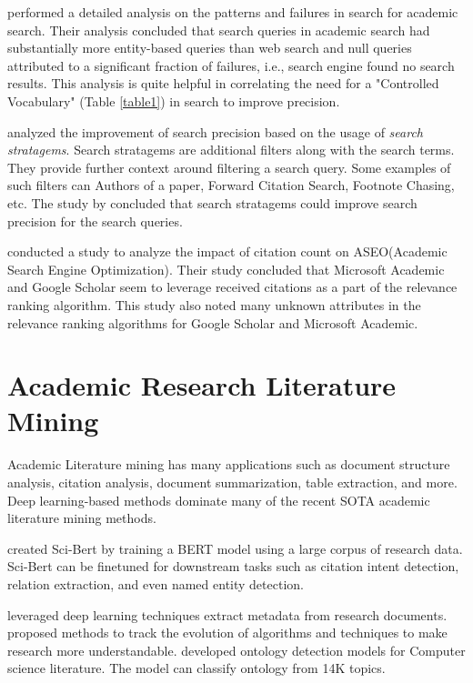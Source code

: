 \cite{li2017investigating} performed a detailed analysis on the patterns and failures in search for academic search. 
Their analysis concluded that search queries in academic search had substantially more entity-based queries than web search and 
null queries attributed to a significant fraction of failures, i.e., search engine found no search results. 
This analysis is quite helpful in correlating the need for a "Controlled Vocabulary" (Table \ref{table1}) in search to improve precision. 

\cite{kacem2018analysis} analyzed the improvement of search precision based on the usage of \textit{search stratagems}.
Search stratagems are additional filters along with the search terms. They provide further context around filtering a search query. 
Some examples of such filters can Authors of a paper, Forward Citation Search, Footnote Chasing, etc.
The study by \cite{kacem2018analysis} concluded that search stratagems could improve search precision for the search queries.

\cite{rovira2019ranking} conducted a study to analyze the impact of citation count on ASEO(Academic Search Engine Optimization). 
Their study concluded that Microsoft Academic and Google Scholar seem to leverage received citations as a part of the relevance 
ranking algorithm. This study also noted many unknown attributes in the relevance ranking algorithms for Google Scholar and Microsoft Academic.


\section{Academic Research Literature Mining}
\label{relatedwork:acad-lit-mining}
Academic Literature mining has many applications such as document structure analysis, citation analysis, document summarization, table extraction, and more. Deep learning-based methods dominate many of the recent SOTA academic literature mining methods. 

\cite{beltagy2019scibert} created Sci-Bert by training a BERT model \parencite{devlin2018bert} using a large corpus of research data. Sci-Bert can be finetuned for downstream tasks such as citation intent detection, relation extraction, and even named entity detection. 
 
\cite{safder2020deep} leveraged deep learning techniques extract metadata from research documents. \cite{zha2019mining} proposed methods to track the evolution of algorithms and techniques to make research more understandable. \cite{salatino2020ontology} developed ontology detection models for Computer science literature. The model can classify ontology from 14K topics.

